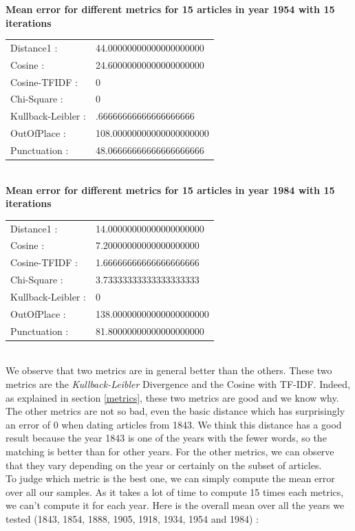 \textbf{Mean error for different metrics for 15 articles in year 1954 with 15 iterations}\\
\begin{tabular}{p{3cm} p{5cm}}
    Distance1 :& 44.00000000000000000000\\
    Cosine :& 24.60000000000000000000\\
    Cosine-TFIDF :& 0\\
    Chi-Square :& 0\\
    Kullback-Leibler :& .66666666666666666666\\
    OutOfPlace :& 108.00000000000000000000\\
    Punctuation :& 48.06666666666666666666\\
\end{tabular}\\
 
\textbf{Mean error for different metrics for 15 articles in year 1984 with 15 iterations}\\
\begin{tabular}{p{3cm} p{5cm}}
    Distance1 :& 14.00000000000000000000\\
    Cosine :& 7.20000000000000000000\\
    Cosine-TFIDF :& 1.66666666666666666666\\
    Chi-Square :& 3.73333333333333333333\\
    Kullback-Leibler :& 0\\
    OutOfPlace :& 138.00000000000000000000\\
    Punctuation :& 81.80000000000000000000\\
\end{tabular}\\

We observe that two metrics are in general better than the others. These two metrics are the \emph{Kullback-Leibler} Divergence and the Cosine with TF-IDF. Indeed, as explained in section \ref{metrics}, these two metrics are good and we know why. The other metrics are not so bad, even the basic distance which has surprisingly an error of 0 when dating articles from 1843. We think this distance has a good result because the year 1843 is one of the years with the fewer words, so the matching is better than for other years. For the other metrics, we can observe that they vary depending on the year or certainly on the subset of articles.\\

To judge which metric is the best one, we can simply compute the mean error over all our samples. As it takes a lot of time to compute 15 times each metrics, we can't compute it for each year. Here is the overall mean over all the years we tested (1843, 1854, 1888, 1905, 1918, 1934, 1954 and 1984) :\\

